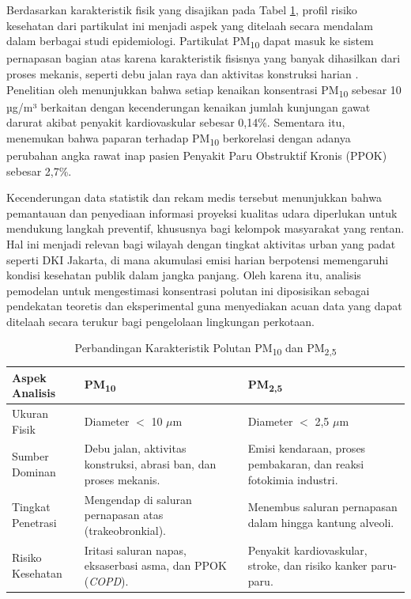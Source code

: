 Berdasarkan karakteristik fisik yang disajikan pada Tabel \ref{tbl:pm10vspm25}, profil risiko kesehatan dari partikulat ini menjadi aspek yang ditelaah secara mendalam dalam berbagai studi epidemiologi. Partikulat PM\textsubscript{10} dapat masuk ke sistem pernapasan bagian atas karena karakteristik fisisnya yang banyak dihasilkan dari proses mekanis, seperti debu jalan raya dan aktivitas konstruksi harian \autocite{firdaus2023jakarta}. Penelitian oleh \textcite{zhang2021association} menunjukkan bahwa setiap kenaikan konsentrasi PM\textsubscript{10} sebesar 10 µg/m³ berkaitan dengan kecenderungan kenaikan jumlah kunjungan gawat darurat akibat penyakit kardiovaskular sebesar 0,14\%. Sementara itu, \textcite{kyung2020particulate} menemukan bahwa paparan terhadap PM\textsubscript{10} berkorelasi dengan adanya perubahan angka rawat inap pasien Penyakit Paru Obstruktif Kronis (PPOK) sebesar 2,7\%.

Kecenderungan data statistik dan rekam medis tersebut menunjukkan bahwa pemantauan dan penyediaan informasi proyeksi kualitas udara diperlukan untuk mendukung langkah preventif, khususnya bagi kelompok masyarakat yang rentan. Hal ini menjadi relevan bagi wilayah dengan tingkat aktivitas urban yang padat seperti DKI Jakarta, di mana akumulasi emisi harian berpotensi memengaruhi kondisi kesehatan publik dalam jangka panjang. Oleh karena itu, analisis pemodelan untuk mengestimasi konsentrasi polutan ini diposisikan sebagai pendekatan teoretis dan eksperimental guna menyediakan acuan data yang dapat ditelaah secara terukur bagi pengelolaan lingkungan perkotaan.

\begin{table}[htbp]
\centering
\captionsetup{justification=centering}
\setlength{\tabcolsep}{6pt}
\caption{Perbandingan Karakteristik Polutan PM\textsubscript{10} dan PM\textsubscript{2,5}}
\label{tbl:pm10vspm25}

\begin{tabularx}{\textwidth}{|>{\raggedright\arraybackslash}p{2.8cm}|
                             >{\raggedright\arraybackslash}X|
                             >{\raggedright\arraybackslash}X|}
\hline
\textbf{Aspek Analisis} & \textbf{PM\textsubscript{10}} & \textbf{PM\textsubscript{2,5}} \\
\hline
Ukuran Fisik & Diameter $<$ 10 $\mu$m & Diameter $<$ 2,5 $\mu$m \\
\hline
Sumber Dominan & Debu jalan, aktivitas konstruksi, abrasi ban, dan proses mekanis. & Emisi kendaraan, proses pembakaran, dan reaksi fotokimia industri. \\
\hline
Tingkat Penetrasi & Mengendap di saluran pernapasan atas (trakeobronkial). & Menembus saluran pernapasan dalam hingga kantung alveoli. \\
\hline
Risiko Kesehatan & Iritasi saluran napas, eksaserbasi asma, dan PPOK (\textit{COPD}). & Penyakit kardiovaskular, stroke, dan risiko kanker paru-paru. \\
\hline
\end{tabularx}
\end{table}

